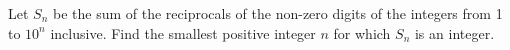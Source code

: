 Let $S_n$ be the sum of the reciprocals of the non-zero digits of the integers from 1 to $10^n$ inclusive. Find the smallest positive integer $n$ for which $S_n$ is an integer.